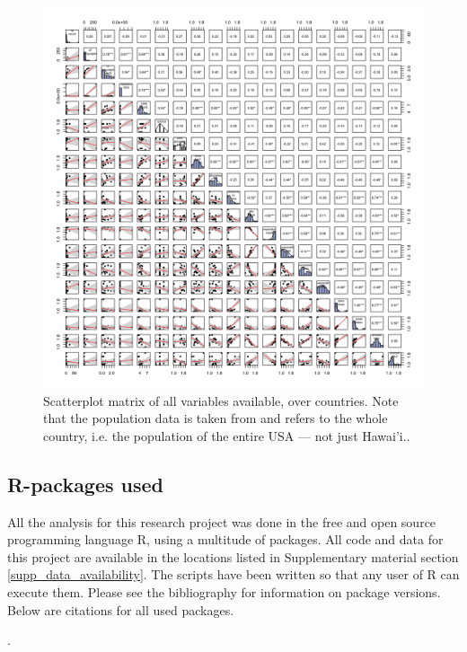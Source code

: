 \documentclass[a4paper,10pt]{article} %
\begin{document}
\begin{figure}[ht]

    \includegraphics[width=15cm]{latex/SPLOM_country_all_variables.png}
\caption{Scatterplot matrix of all variables available, over countries. Note that the population data is taken from \citet{UN_pop} and refers to the whole country, i.e. the population of the entire USA --- not just Hawai'i..}
\label{SPLOM_country_all_variables}
\end{figure}

\FloatBarrier
\newpage
\subsection{R-packages used}
\label{appendix_r_packages}

All the analysis for this research project was done in the free and open source programming language R, using a multitude of packages. All code and data for this project are available in the locations listed in Supplementary material section \ref{supp_data_availability}. The scripts have been written so that any user of R can execute them. Please see the bibliography for information on package versions. Below are citations for all used packages.

.
\end{document}
